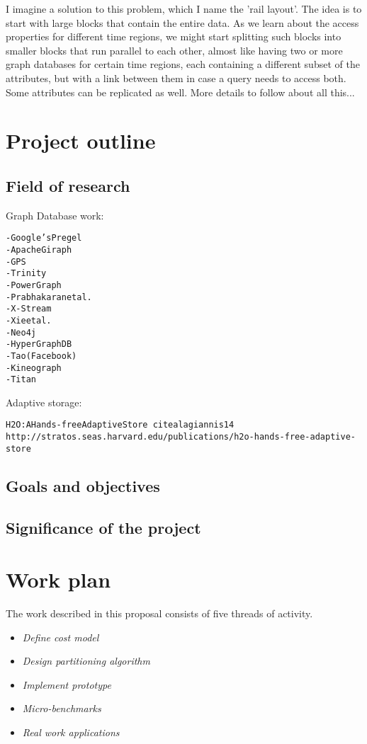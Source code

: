 \documentclass[11pt]{article}
\begin{document}
I imagine a solution to this problem, which I name the 'rail layout'. The idea
is to start with large blocks that contain the entire data. As we learn about
the access properties for different time regions, we might start splitting
such blocks into smaller blocks that run parallel to each other, almost like
having two or more graph databases for certain time regions, each containing a
 different subset of the attributes, but with a link between them in case a
query needs to access both. Some attributes can be replicated as well.
More details to follow about all this...


\section{Project outline}

\subsection{Field of research}

Graph Database work:
\begin{alltt}\scriptsize
- Google’s Pregel~\cite{malewicz10}
- Apache Giraph~\cite{giraph}
- GPS~\cite{salihoglu13}
- Trinity~\cite{shao13}
- PowerGraph~\cite{gonzalez12}
- Prabhakaran et al.~\cite{prabhakaran12}
- X-Stream~\cite{roy13}
- Xie et al. ~\cite{xie13}
- Neo4j ~\cite{neo4j}
- HyperGraphDB ~\cite{hypergraphdb}
- Tao (Facebook)~\cite{venkataramani12}
- Kineograph~\cite{cheng12}
-  Titan ~\cite{titan}
\end{alltt} 

Adaptive storage:
\begin{alltt}\scriptsize
H2O: A Hands-free Adaptive Store~cite{alagiannis14}
http://stratos.seas.harvard.edu/publications/h2o-hands-free-adaptive-store
\end{alltt} 


\subsection{Goals and objectives}
\subsection{Significance of the project}

\section{Work plan}

The work described in this proposal consists of five threads of activity.
\begin{itemize}
\item \emph{Define cost model}
\item \emph{Design partitioning algorithm}
\item \emph{Implement prototype}
\item \emph{Micro-benchmarks}
\item \emph{Real work applications}
\end{itemize}


{\footnotesize

\balance

}
 
\end{document}
